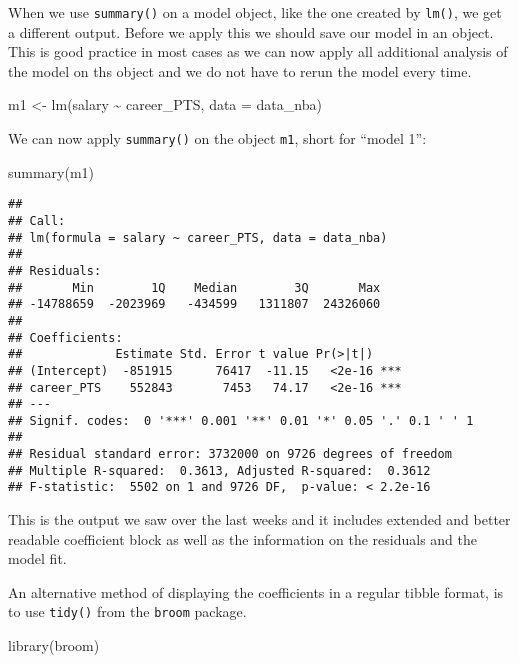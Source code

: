 \documentclass[
]{book}
\newenvironment{Shaded}{\begin{snugshade}}{\end{snugshade}}
\newcommand{\AttributeTok}[1]{\textcolor[rgb]{0.77,0.63,0.00}{#1}}
\newcommand{\AttributeTok}[1]{\textcolor[rgb]{0.13,0.29,0.53}{#1}}
\newcommand{\FunctionTok}[1]{\textcolor[rgb]{0.00,0.00,0.00}{#1}}
\newcommand{\FunctionTok}[1]{\textcolor[rgb]{0.13,0.29,0.53}{\textbf{#1}}}
\newcommand{\NormalTok}[1]{#1}
\newcommand{\OtherTok}[1]{\textcolor[rgb]{0.56,0.35,0.01}{#1}}
\newcommand{\SpecialCharTok}[1]{\textcolor[rgb]{0.00,0.00,0.00}{#1}}
\newcommand{\SpecialCharTok}[1]{\textcolor[rgb]{0.81,0.36,0.00}{\textbf{#1}}}
\begin{document}
When we use \texttt{summary()} on a model object, like the one created by \texttt{lm()}, we
get a different output. Before we apply this we should save our model in an
object. This is good practice in most cases as we can now apply all additional
analysis of the model on ths object and we do not have to rerun the model
every time.

\begin{Shaded}
\begin{Highlighting}[]
\NormalTok{m1 }\OtherTok{\textless{}{-}} \FunctionTok{lm}\NormalTok{(salary }\SpecialCharTok{\textasciitilde{}}\NormalTok{ career\_PTS, }\AttributeTok{data =}\NormalTok{ data\_nba)}
\end{Highlighting}
\end{Shaded}

We can now apply \texttt{summary()} on the object \texttt{m1}, short for ``model 1'':

\begin{Shaded}
\begin{Highlighting}[]
\FunctionTok{summary}\NormalTok{(m1)}
\end{Highlighting}
\end{Shaded}

\begin{verbatim}
## 
## Call:
## lm(formula = salary ~ career_PTS, data = data_nba)
## 
## Residuals:
##       Min        1Q    Median        3Q       Max 
## -14788659  -2023969   -434599   1311807  24326060 
## 
## Coefficients:
##             Estimate Std. Error t value Pr(>|t|)    
## (Intercept)  -851915      76417  -11.15   <2e-16 ***
## career_PTS    552843       7453   74.17   <2e-16 ***
## ---
## Signif. codes:  0 '***' 0.001 '**' 0.01 '*' 0.05 '.' 0.1 ' ' 1
## 
## Residual standard error: 3732000 on 9726 degrees of freedom
## Multiple R-squared:  0.3613, Adjusted R-squared:  0.3612 
## F-statistic:  5502 on 1 and 9726 DF,  p-value: < 2.2e-16
\end{verbatim}

This is the output we saw over the last weeks and it includes extended and
better readable coefficient block as well as the information on the residuals
and the model fit.

An alternative method of displaying the coefficients in a regular tibble format,
is to use \texttt{tidy()} from the \texttt{broom} package.

\begin{Shaded}
\begin{Highlighting}[]
\FunctionTok{library}\NormalTok{(broom)}
\end{Highlighting}
\end{Shaded}
\end{document}
